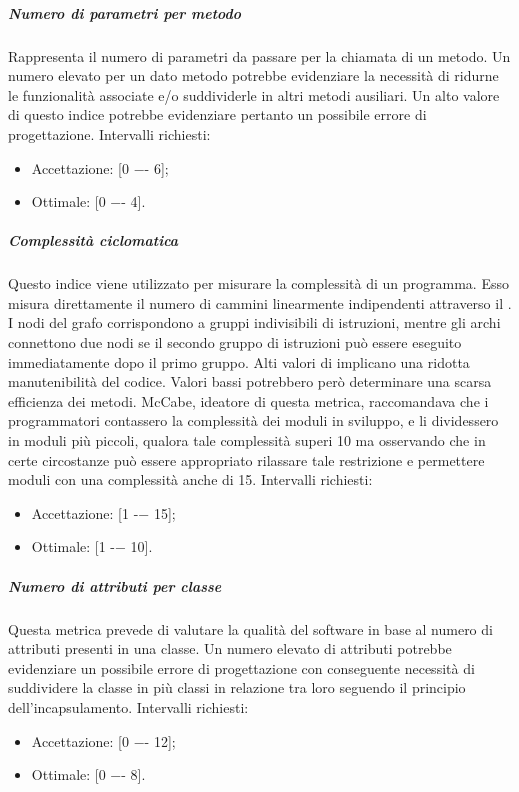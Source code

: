 \subparagraph{Numero di parametri per metodo}
Rappresenta il numero di parametri da passare per la chiamata di un metodo.
Un numero elevato per un dato metodo potrebbe evidenziare la necessità di ridurne le funzionalità associate e/o suddividerle in altri metodi ausiliari.
Un alto valore di questo indice potrebbe evidenziare pertanto un possibile errore di progettazione.
Intervalli richiesti:
\begin{itemize}
\item
Accettazione: [0 −- 6];
\item
Ottimale: [0 −- 4].
\end{itemize}

\subparagraph{Complessità ciclomatica}
Questo indice viene utilizzato per misurare la complessità di un programma. Esso misura direttamente il numero di cammini linearmente indipendenti attraverso il . I nodi del grafo corrispondono a gruppi indivisibili di istruzioni, mentre gli archi connettono due nodi se il secondo gruppo di istruzioni può essere eseguito immediatamente dopo il primo gruppo.
Alti valori di  implicano una ridotta manutenibilità del codice. Valori bassi potrebbero però determinare  una scarsa efficienza dei metodi. McCabe, ideatore di questa metrica, raccomandava che i programmatori contassero la complessità dei moduli in sviluppo, e li dividessero in moduli più piccoli, qualora tale complessità superi 10 ma osservando che in certe circostanze può essere appropriato rilassare tale restrizione e permettere moduli con una complessità anche di 15.
Intervalli richiesti:
\begin{itemize}
\item
Accettazione: [1 -− 15];
\item
Ottimale: [1 -− 10].
\end{itemize}

\subparagraph{Numero di attributi per classe}
Questa metrica prevede di valutare la qualità del software in base al numero di attributi presenti in una classe.
Un numero elevato di attributi potrebbe evidenziare un possibile errore di progettazione con conseguente necessità di suddividere la classe in più classi in relazione tra loro seguendo il principio dell'incapsulamento.
Intervalli richiesti:
\begin{itemize}
\item
Accettazione: [0 −- 12];
\item
Ottimale: [0 −- 8].
\end{itemize}


